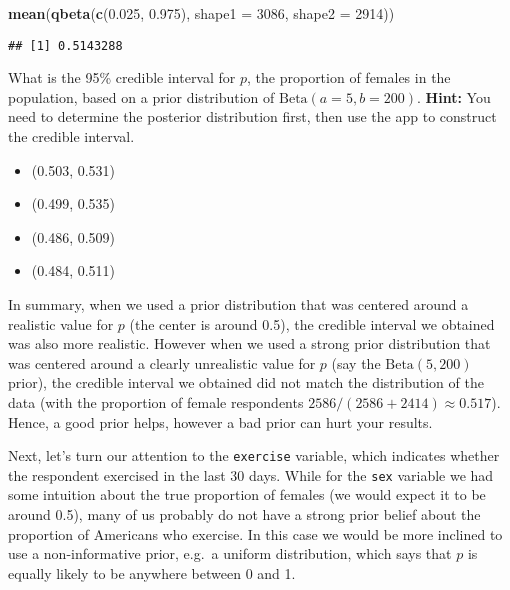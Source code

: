 \documentclass[
]{article}
\newenvironment{Shaded}{\begin{snugshade}}{\end{snugshade}}
\newcommand{\DataTypeTok}[1]{\textcolor[rgb]{0.13,0.29,0.53}{#1}}
\newcommand{\DecValTok}[1]{\textcolor[rgb]{0.00,0.00,0.81}{#1}}
\newcommand{\FloatTok}[1]{\textcolor[rgb]{0.00,0.00,0.81}{#1}}
\newcommand{\KeywordTok}[1]{\textcolor[rgb]{0.13,0.29,0.53}{\textbf{#1}}}
\newcommand{\NormalTok}[1]{#1}
\providecommand{\tightlist}{%
  \setlength{\itemsep}{0pt}\setlength{\parskip}{0pt}}
\begin{document}
\begin{Shaded}
\begin{Highlighting}[]
\KeywordTok{mean}\NormalTok{(}\KeywordTok{qbeta}\NormalTok{(}\KeywordTok{c}\NormalTok{(}\FloatTok{0.025}\NormalTok{, }\FloatTok{0.975}\NormalTok{), }\DataTypeTok{shape1 =} \DecValTok{3086}\NormalTok{, }\DataTypeTok{shape2 =} \DecValTok{2914}\NormalTok{))}
\end{Highlighting}
\end{Shaded}

\begin{verbatim}
## [1] 0.5143288
\end{verbatim}

What is the 95\% credible interval for \(p\), the proportion of females
in the population, based on a prior distribution of
\(\text{Beta}(a = 5, b = 200)\). \textbf{Hint:} You need to determine
the posterior distribution first, then use the app to construct the
credible interval.

\begin{itemize}
\tightlist
\item
  (0.503, 0.531)
\item
  (0.499, 0.535)
\item
  (0.486, 0.509)
\item
  (0.484, 0.511)
\end{itemize}

In summary, when we used a prior distribution that was centered around a
realistic value for \(p\) (the center is around 0.5), the credible
interval we obtained was also more realistic. However when we used a
strong prior distribution that was centered around a clearly unrealistic
value for \(p\) (say the \(\text{Beta}(5, 200)\) prior), the credible
interval we obtained did not match the distribution of the data (with
the proportion of female respondents
\(2586/(2586+2414) \approx 0.517\)). Hence, a good prior helps, however
a bad prior can hurt your results.

Next, let's turn our attention to the \texttt{exercise} variable, which
indicates whether the respondent exercised in the last 30 days. While
for the \texttt{sex} variable we had some intuition about the true
proportion of females (we would expect it to be around 0.5), many of us
probably do not have a strong prior belief about the proportion of
Americans who exercise. In this case we would be more inclined to use a
non-informative prior, e.g.~a uniform distribution, which says that
\(p\) is equally likely to be anywhere between 0 and 1.
\end{document}
